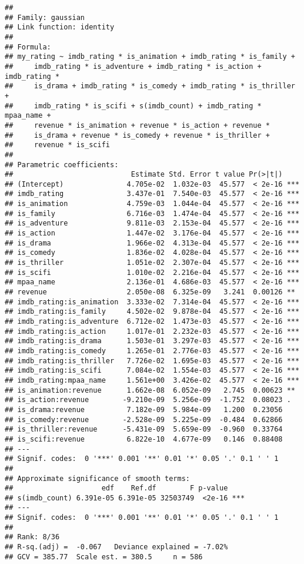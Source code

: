 \documentclass[
]{article}
\begin{document}
\begin{verbatim}
## 
## Family: gaussian 
## Link function: identity 
## 
## Formula:
## my_rating ~ imdb_rating * is_animation + imdb_rating * is_family + 
##     imdb_rating * is_adventure + imdb_rating * is_action + imdb_rating * 
##     is_drama + imdb_rating * is_comedy + imdb_rating * is_thriller + 
##     imdb_rating * is_scifi + s(imdb_count) + imdb_rating * mpaa_name + 
##     revenue * is_animation + revenue * is_action + revenue * 
##     is_drama + revenue * is_comedy + revenue * is_thriller + 
##     revenue * is_scifi
## 
## Parametric coefficients:
##                            Estimate Std. Error t value Pr(>|t|)    
## (Intercept)               4.705e-02  1.032e-03  45.577  < 2e-16 ***
## imdb_rating               3.437e-01  7.540e-03  45.577  < 2e-16 ***
## is_animation              4.759e-03  1.044e-04  45.577  < 2e-16 ***
## is_family                 6.716e-03  1.474e-04  45.577  < 2e-16 ***
## is_adventure              9.811e-03  2.153e-04  45.577  < 2e-16 ***
## is_action                 1.447e-02  3.176e-04  45.577  < 2e-16 ***
## is_drama                  1.966e-02  4.313e-04  45.577  < 2e-16 ***
## is_comedy                 1.836e-02  4.028e-04  45.577  < 2e-16 ***
## is_thriller               1.051e-02  2.307e-04  45.577  < 2e-16 ***
## is_scifi                  1.010e-02  2.216e-04  45.577  < 2e-16 ***
## mpaa_name                 2.136e-01  4.686e-03  45.577  < 2e-16 ***
## revenue                   2.050e-08  6.325e-09   3.241  0.00126 ** 
## imdb_rating:is_animation  3.333e-02  7.314e-04  45.577  < 2e-16 ***
## imdb_rating:is_family     4.502e-02  9.878e-04  45.577  < 2e-16 ***
## imdb_rating:is_adventure  6.712e-02  1.473e-03  45.577  < 2e-16 ***
## imdb_rating:is_action     1.017e-01  2.232e-03  45.577  < 2e-16 ***
## imdb_rating:is_drama      1.503e-01  3.297e-03  45.577  < 2e-16 ***
## imdb_rating:is_comedy     1.265e-01  2.776e-03  45.577  < 2e-16 ***
## imdb_rating:is_thriller   7.726e-02  1.695e-03  45.577  < 2e-16 ***
## imdb_rating:is_scifi      7.084e-02  1.554e-03  45.577  < 2e-16 ***
## imdb_rating:mpaa_name     1.561e+00  3.426e-02  45.577  < 2e-16 ***
## is_animation:revenue      1.662e-08  6.052e-09   2.745  0.00623 ** 
## is_action:revenue        -9.210e-09  5.256e-09  -1.752  0.08023 .  
## is_drama:revenue          7.182e-09  5.984e-09   1.200  0.23056    
## is_comedy:revenue        -2.528e-09  5.225e-09  -0.484  0.62866    
## is_thriller:revenue      -5.431e-09  5.659e-09  -0.960  0.33764    
## is_scifi:revenue          6.822e-10  4.677e-09   0.146  0.88408    
## ---
## Signif. codes:  0 '***' 0.001 '**' 0.01 '*' 0.05 '.' 0.1 ' ' 1
## 
## Approximate significance of smooth terms:
##                     edf    Ref.df        F p-value    
## s(imdb_count) 6.391e-05 6.391e-05 32503749  <2e-16 ***
## ---
## Signif. codes:  0 '***' 0.001 '**' 0.01 '*' 0.05 '.' 0.1 ' ' 1
## 
## Rank: 8/36
## R-sq.(adj) =  -0.067   Deviance explained = -7.02%
## GCV = 385.77  Scale est. = 380.5     n = 586
\end{verbatim}
\end{document}
